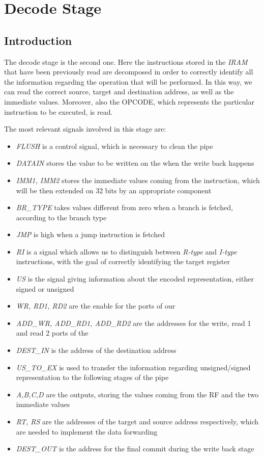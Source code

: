 \section{Decode Stage}
\label{chap_dec}

\subsection{Introduction}
The decode stage is the second one. Here the instructions stored in the \textit{IRAM} that have been previously read are decomposed in order to correctly identify all the information regarding the operation that will be performed. In this way, we can read the correct source, target and destination address, as well as the immediate values. Moreover, also the \textsf{OPCODE}, which represents the particular instruction to be executed, is read.

The most relevant signals involved in this stage are:
\begin{itemize}
	\item \textit{FLUSH} is a control signal, which is necessary to clean the pipe
	\item \textit{DATAIN} stores the value to be written on the \rf when the write back happens
	\item \textit{IMM1, IMM2} stores the immediate values coming from the instruction, which will be then extended on 32 bits by an appropriate component
	\item \textit{BR\_TYPE} takes values different from zero when a branch is fetched, according to the branch type
	\item \textit{JMP} is high when a jump instruction is fetched
	\item \textit{RI} is a signal which allows us to distinguish between \textit{R-type} and \textit{I-type} instructions, with the goal of correctly identifying the target register
	\item \textit{US} is the signal giving information about the encoded representation, either signed or unsigned
	\item \textit{WR, RD1, RD2} are the enable for the ports of our \rf
	\item \textit{ADD\_WR, ADD\_RD1, ADD\_RD2} are the addresses for the write, read 1 and read 2 ports of the \rf
	\item \textit{DEST\_IN} is the address of the destination address
	\item \textit{US\_TO\_EX} is used to transfer the information regarding unsigned/signed representation to the following stages of the pipe
	\item \textit{A,B,C,D} are the outputs, storing the values coming from the \textsf{RF} and the two immediate values
	\item \textit{RT, RS} are the addresses of the target and source address respectively, which are needed to implement the data forwarding
	\item \textit{DEST\_OUT} is the address for the final commit during the write back stage
\end{itemize}


